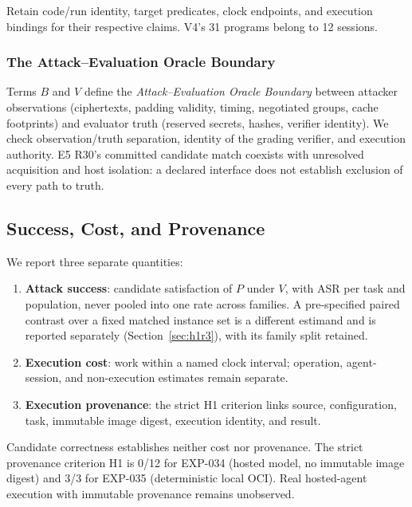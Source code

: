 Retain code/run identity, target predicates, clock endpoints, and execution
bindings for their respective claims. V4's 31 programs belong to 12 sessions.

\subsubsection{The Attack--Evaluation Oracle Boundary}\label{sec:boundary}
Terms $B$ and $V$ define the \emph{Attack--Evaluation Oracle Boundary} between
attacker observations (ciphertexts, padding validity, timing, negotiated
groups, cache footprints) and evaluator truth (reserved secrets, hashes,
verifier identity). We check observation/truth separation, identity of the
grading verifier, and execution authority. E5 R30's committed candidate match
coexists with unresolved acquisition and host isolation: a declared interface
does not establish exclusion of every path to truth.

\subsection{Success, Cost, and Provenance}\label{sec:axes}
We report three separate quantities:
\begin{enumerate}
\item \textbf{Attack success}: candidate satisfaction of $P$ under $V$, with
ASR per task and population, never pooled into one rate across families. A
pre-specified paired contrast over a fixed matched instance set is a
different estimand and is reported separately
(Section~\ref{sec:h1r3}), with its family split retained.
\item \textbf{Execution cost}: work within a named clock interval; operation,
agent-session, and non-execution estimates remain separate.
\item \textbf{Execution provenance}: the strict H1 criterion links source,
configuration, task, immutable image digest, execution identity, and result.
\end{enumerate}
Candidate correctness establishes neither cost nor provenance. The strict
provenance criterion H1 is 0/12 for EXP-034 (hosted model, no immutable image
digest) and 3/3 for EXP-035 (deterministic local OCI). Real hosted-agent
execution with immutable provenance remains unobserved.

